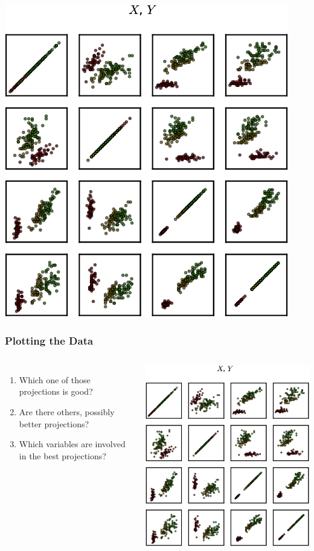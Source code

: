 \begin{frame}[plain]
  \begin{center}
   
    \includegraphics[height=.99\textheight]{pca-pics/iris-all}

  \end{center}
\end{frame}

\begin{frame}
  \frametitle{Plotting the Data}
  \begin{columns}

    \begin{enumerate}
    \item<1-> Which one of those projections is \alert{good}?
    \item<2-> Are there others, possibly \alert{better} projections?
    \item<3-> \alert{Which variables} are involved in the best
      projections?
    \end{enumerate}
    \includegraphics<1->[width=\linewidth]{pca-pics/iris-all}
  \end{columns}
\end{frame}

